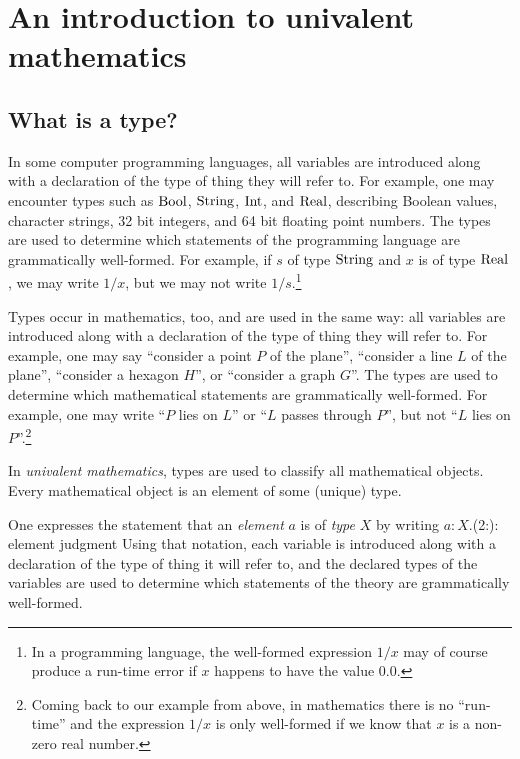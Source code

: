 \chapter{An introduction to univalent mathematics}
\label{ch:univalent-mathematics}

\section{What is a type?}
\label{sec:what-is-a-type}

In some computer programming languages, all variables are introduced along with a declaration of the type of thing they will refer to.  For example,
one may encounter types such as $\mathrm{Bool}$, $\mathrm{String}$, $\mathrm{Int}$, and $\mathrm{Real}$, describing Boolean values, character strings, 32 bit integers, and 64 bit
floating point numbers.  The types are used to determine which statements of the programming language are grammatically well-formed.
For example, if $s$ of type $\mathrm{String}$ and $x$ is of type $\mathrm{Real}$, we may write $1/x$, but we may not write $1/s$.\footnote{%
  In a programming language, the well-formed expression $1/x$ may of course
  produce a run-time error if $x$ happens to have the value $0{.}0$.}

Types occur in mathematics, too, and are used in the same way: all variables are introduced along with a declaration of the type of thing they
will refer to.
For example, one may say ``consider a point $P$ of the plane'', ``consider a line $L$ of the plane'', ``consider a hexagon
$H$'', or ``consider a graph $G$''.  The types are used to determine which mathematical statements are grammatically well-formed.  For example,
one may write ``$P$ lies on $L$'' or ``$L$ passes through $P$'', but not ``$L$ lies on $P$''.\footnote{%
  Coming back to our example from above, in mathematics there is no ``run-time''
  and the expression $1/x$ is only well-formed if we know that $x$ is a non-zero
  real number.}

In \emph{univalent mathematics},
types are used to classify all mathematical objects.  Every mathematical object is an element of some (unique)
type.

One expresses the statement that an \emph{element} $a$ is of \emph{type} $X$ by writing $a:X$.\glossary(2:){${:}$}{element judgment}
Using that notation, each variable is introduced along
with a declaration of the type of thing it will refer to, and the declared types of the variables are used to determine which statements of the
theory are grammatically well-formed.

